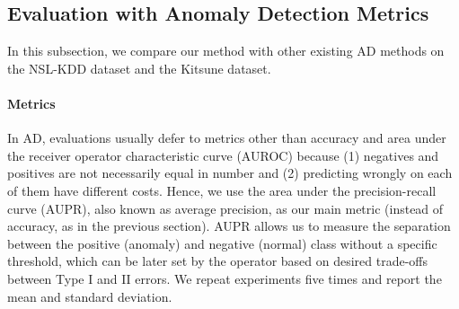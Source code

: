 \documentclass{article}
\begin{document}


\subsection{Evaluation with Anomaly Detection Metrics}
In this subsection, we compare our method with other existing AD methods on the NSL-KDD dataset and the Kitsune dataset. 


\paragraph*{Metrics}
In AD, evaluations usually defer to metrics other than accuracy and area under the receiver operator characteristic curve (AUROC) because (1) negatives and positives are not necessarily equal in number and (2) predicting wrongly on each of them have different costs.
Hence, we use the area under the precision-recall curve (AUPR), also known as average precision, as our main metric (instead of accuracy, as in the previous section).
AUPR allows us to measure the separation between the positive (anomaly) and negative (normal) class without a specific threshold, which can be later set by the operator based on desired trade-offs between Type I and II errors.
We repeat experiments five times and report the mean and standard deviation.
\end{document}
